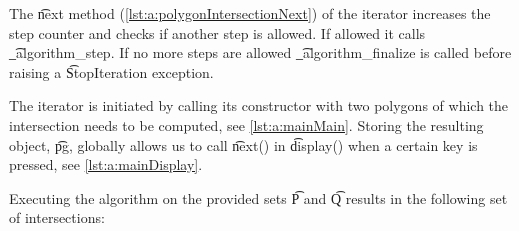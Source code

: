 	The \t{next} method (\autoref{lst:a:polygonIntersectionNext}) of the iterator increases the step counter and checks if another step is allowed. If allowed it calls \t{_algorithm_step}. If no more steps are allowed \t{_algorithm_finalize} is called before raising a \t{StopIteration} exception. 

	

	

	The iterator is initiated by calling its constructor with two polygons of which the intersection needs to be computed, see \autoref{lst:a:mainMain}. Storing the resulting object, \t{pg}, globally allows us to call \t{next()} in \t{display()} when a certain key is pressed, see \autoref{lst:a:mainDisplay}.

	

	

	Executing the algorithm on the provided sets \t{P} and \t{Q} results in the following set of intersections:

